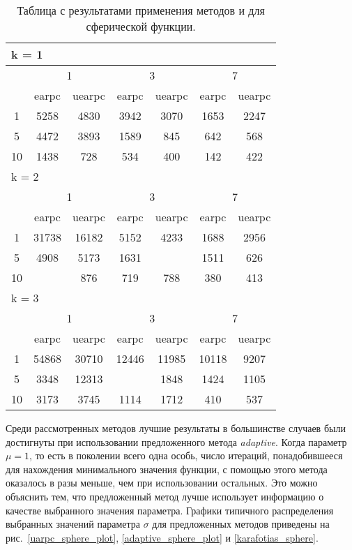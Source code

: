 \begin{table}
  \centering
  \begin{tabular}{|*7{c|}}
    \hline
    \multicolumn{7}{|l|}{k = 1} \\
    \hline
    \multirow{2}{*}{\diagbox{$\mu$}{$\lambda$}} & \multicolumn{2}{c|}{1} & \multicolumn{2}{c|}{3} & \multicolumn{2}{c|}{7} \\
    \cline{2-7}
    & earpc & uearpc & earpc & uearpc & earpc & uearpc \\
    \hline
    1 & 5258 & 4830 & 3942 & 3070 & 1653 & 2247 \\
    \hline
    5 & 4472 & 3893 & 1589 & 845 & 642& 568 \\
    \hline
    10 & 1438 & 728 & 534 & 400& 142 & 422 \\
    \hline
    \multicolumn{7}{|l|}{k = 2} \\
    \hline
    \multirow{2}{*}{\diagbox{$\mu$}{$\lambda$}} & \multicolumn{2}{c|}{1} & \multicolumn{2}{c|}{3} & \multicolumn{2}{c|}{7} \\
    \cline{2-7}
    & earpc & uearpc & earpc & uearpc & earpc & uearpc \\
    \hline
    1 & 31738 & 16182 & 5152 & 4233 & 1688 & 2956 \\
    \hline
    5 & 4908 & 5173 & 1631& \cellcolor{olive}{946} & 1511 & 626 \\
    \hline
    10& \cellcolor{olive}{778} & 876 & 719 & 788 & 380 & 413 \\
    \hline
    \multicolumn{7}{|l|}{k = 3} \\
    \hline
    \multirow{2}{*}{\diagbox{$\mu$}{$\lambda$}} & \multicolumn{2}{c|}{1} & \multicolumn{2}{c|}{3} & \multicolumn{2}{c|}{7} \\
    \cline{2-7}
    & earpc & uearpc & earpc & uearpc & earpc & uearpc \\
    \hline
    1 & 54868 & 30710 & 12446 & 11985 & 10118 & 9207 \\
    \hline
    5 & 3348 & 12313& \cellcolor{olive}{1379} & 1848 & 1424 & 1105 \\
    \hline
    10 & 3173 & 3745 & 1114 & 1712 & 410 & 537 \\
    \hline
  \end{tabular}
  \captionsetup{justification=centering}
  \caption{Таблица с результатами применения методов  и  для сферической функции.}
  \label{earpc_sphere_results}
\end{table}

Среди рассмотренных методов лучшие результаты в большинстве случаев были достигнуты при использовании предложенного метода \textit{adaptive}. Когда параметр $\mu = 1$, то есть в поколении всего одна особь, число итераций, понадобившееся для нахождения минимального значения функции, с помощью этого метода оказалось в разы меньше, чем при использовании остальных. Это можно объяснить тем, что предложенный метод лучше использует информацию о качестве выбранного значения параметра. Графики типичного распределения выбранных значений параметра $\sigma$ для предложенных методов приведены на рис.~\ref{uarpc_sphere_plot}, \ref{adaptive_sphere_plot} и \ref{karafotias_sphere}.

